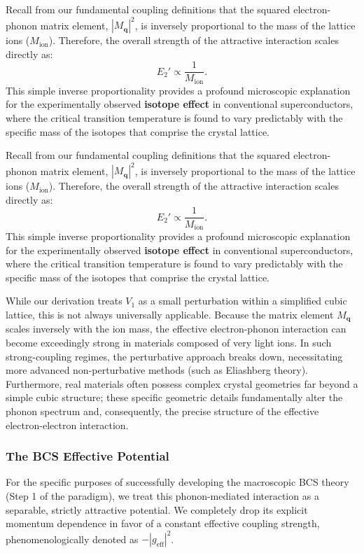 Recall from our fundamental coupling definitions that the squared electron-phonon matrix element, \( |M_{\mathbf{q}}|^2 \), is inversely proportional to the mass of the lattice ions (\( M_{\text{ion}} \)). Therefore, the overall strength of the attractive interaction scales directly as:
\[
    E_2' \propto \frac{1}{M_{\text{ion}}}.
\]
This simple inverse proportionality provides a profound microscopic explanation for the experimentally observed \textbf{isotope effect} in conventional superconductors, where the critical transition temperature is found to vary predictably with the specific mass of the isotopes that comprise the crystal lattice.

Recall from our fundamental coupling definitions that the squared electron-phonon matrix element, \( |M_{\mathbf{q}}|^2 \), is inversely proportional to the mass of the lattice ions (\( M_{\text{ion}} \)). Therefore, the overall strength of the attractive interaction scales directly as:
\[
    E_2' \propto \frac{1}{M_{\text{ion}}}.
\]
This simple inverse proportionality provides a profound microscopic explanation for the experimentally observed \textbf{isotope effect} in conventional superconductors, where the critical transition temperature is found to vary predictably with the specific mass of the isotopes that comprise the crystal lattice.

\begin{remark}
    While our derivation treats \( V_1 \) as a small perturbation within a simplified cubic lattice, this is not always universally applicable. Because the matrix element \( M_{\mathbf{q}} \) scales inversely with the ion mass, the effective electron-phonon interaction can become exceedingly strong in materials composed of very light ions. In such strong-coupling regimes, the perturbative approach breaks down, necessitating more advanced non-perturbative methods (such as Eliashberg theory). Furthermore, real materials often possess complex crystal geometries far beyond a simple cubic structure; these specific geometric details fundamentally alter the phonon spectrum and, consequently, the precise structure of the effective electron-electron interaction.
\end{remark}

\subsubsection{The BCS Effective Potential}

For the specific purposes of successfully developing the macroscopic BCS theory (Step 1 of the paradigm), we treat this phonon-mediated interaction as a separable, strictly attractive potential. We completely drop its explicit momentum dependence in favor of a constant effective coupling strength, phenomenologically denoted as \( -|g_{\text{eff}}|^2 \).


